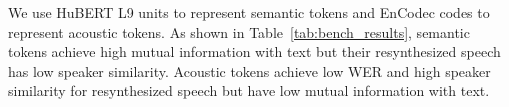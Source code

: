 We use HuBERT L9 units to represent semantic tokens and EnCodec codes to represent acoustic tokens.
As shown in Table~\ref{tab:bench_results}, semantic tokens achieve high mutual information with text but their resynthesized speech has low speaker similarity. 
Acoustic tokens achieve low WER and high speaker similarity for resynthesized speech but have low mutual information with text.



% 